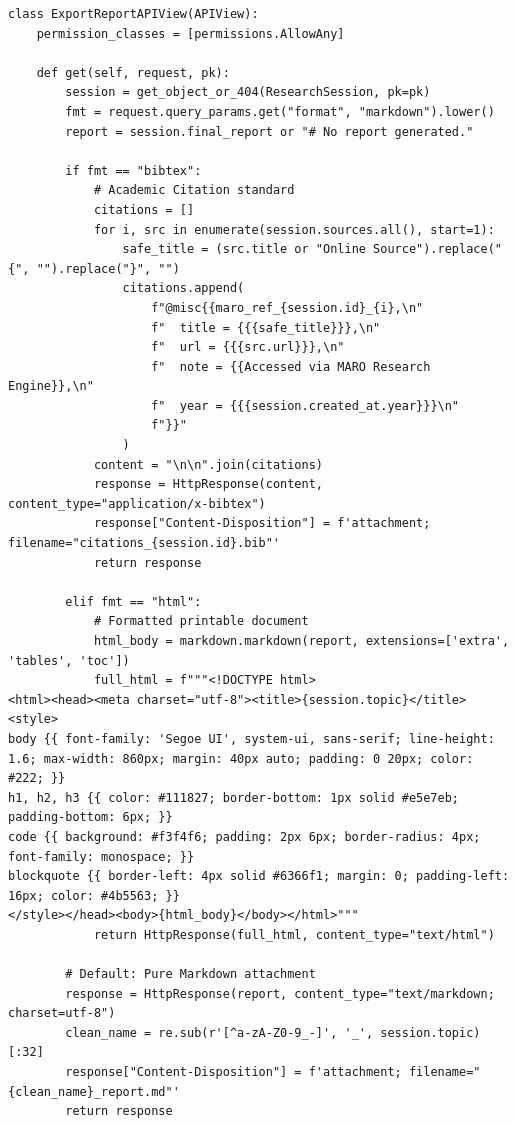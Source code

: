 \documentclass[11pt,a4paper,twoside]{report}
\begin{document}
\begin{lstlisting}[style=pythonstyle,caption={Custom Export Renderer Logic}]
class ExportReportAPIView(APIView):
    permission_classes = [permissions.AllowAny]

    def get(self, request, pk):
        session = get_object_or_404(ResearchSession, pk=pk)
        fmt = request.query_params.get("format", "markdown").lower()
        report = session.final_report or "# No report generated."

        if fmt == "bibtex":
            # Academic Citation standard
            citations = []
            for i, src in enumerate(session.sources.all(), start=1):
                safe_title = (src.title or "Online Source").replace("{", "").replace("}", "")
                citations.append(
                    f"@misc{{maro_ref_{session.id}_{i},\n"
                    f"  title = {{{safe_title}}},\n"
                    f"  url = {{{src.url}}},\n"
                    f"  note = {{Accessed via MARO Research Engine}},\n"
                    f"  year = {{{session.created_at.year}}}\n"
                    f"}}"
                )
            content = "\n\n".join(citations)
            response = HttpResponse(content, content_type="application/x-bibtex")
            response["Content-Disposition"] = f'attachment; filename="citations_{session.id}.bib"'
            return response

        elif fmt == "html":
            # Formatted printable document
            html_body = markdown.markdown(report, extensions=['extra', 'tables', 'toc'])
            full_html = f"""<!DOCTYPE html>
<html><head><meta charset="utf-8"><title>{session.topic}</title>
<style>
body {{ font-family: 'Segoe UI', system-ui, sans-serif; line-height: 1.6; max-width: 860px; margin: 40px auto; padding: 0 20px; color: #222; }}
h1, h2, h3 {{ color: #111827; border-bottom: 1px solid #e5e7eb; padding-bottom: 6px; }}
code {{ background: #f3f4f6; padding: 2px 6px; border-radius: 4px; font-family: monospace; }}
blockquote {{ border-left: 4px solid #6366f1; margin: 0; padding-left: 16px; color: #4b5563; }}
</style></head><body>{html_body}</body></html>"""
            return HttpResponse(full_html, content_type="text/html")

        # Default: Pure Markdown attachment
        response = HttpResponse(report, content_type="text/markdown; charset=utf-8")
        clean_name = re.sub(r'[^a-zA-Z0-9_-]', '_', session.topic)[:32]
        response["Content-Disposition"] = f'attachment; filename="{clean_name}_report.md"'
        return response
\end{lstlisting}
\end{document}
